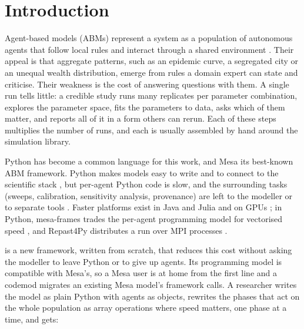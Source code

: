 \section{Introduction}
\label{sec:introduction}

Agent-based models (ABMs) represent a system as a population of autonomous agents that follow
local rules and interact through a shared environment \citep{macal2010tutorial}. Their appeal
is that aggregate patterns, such as an epidemic curve, a segregated city
\citep{schelling1971dynamic} or an unequal wealth distribution, emerge from rules a domain
expert can state and criticise. Their weakness is the cost of answering questions with them.
A single run tells little: a credible study runs many replicates per parameter combination,
explores the parameter space, fits the parameters to data, asks which of them matter, and
reports all of it in a form others can rerun. Each of these steps multiplies the number of
runs, and each is usually assembled by hand around the simulation library.

Python has become a common language for this work, and Mesa \citep{kazil2020mesa,
terhoeven2025mesa3} its best-known ABM framework. Python makes models easy to write and to
connect to the scientific stack \citep{harris2020numpy, virtanen2020scipy}, but per-agent
Python code is slow, and the surrounding tasks (sweeps, calibration, sensitivity analysis,
provenance) are left to the modeller or to separate tools \citep{herman2017salib,
klinger2018pyabc, kwakkel2017ema}. Faster platforms exist in Java and Julia
\citep{luke2005mason, north2013repast, datseris2024agents} and on GPUs
\citep{richmond2023flamegpu}; in Python, mesa-frames trades the per-agent programming model for
vectorised speed \citep{mesaframes}, and Repast4Py distributes a run over MPI processes
\citep{collier2020repast4py}.

\modelly{} is a new framework, written from scratch, that reduces this cost without asking the
modeller to leave Python or to give up agents. Its programming model is compatible with
Mesa's, so a Mesa user is at home from the first line and a codemod migrates an existing Mesa
model's framework calls. A researcher writes the model as plain Python with agents as objects,
rewrites the phases that act on the whole population as array operations where speed matters,
one phase at a time, and gets:

